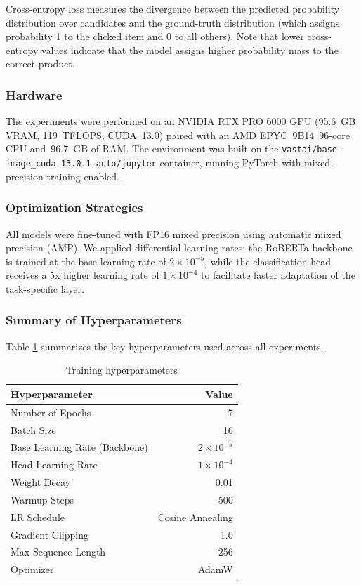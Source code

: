 \documentclass[10pt]{article}
\begin{document}
Cross-entropy loss measures the divergence between the predicted probability distribution over candidates and the ground-truth distribution (which assigns probability 1 to the clicked item and 0 to all others). Note that lower cross-entropy values indicate that the model assigns higher probability mass to the correct product.
\subsubsection*{Hardware}
The experiments were performed on an NVIDIA RTX PRO 6000 GPU (95.6~GB VRAM, 119~TFLOPS, CUDA~13.0) paired with an AMD EPYC~9B14~96-core CPU and~96.7~GB of RAM. The environment was built on the \texttt{vastai/base-image\_cuda-13.0.1-auto/jupyter} container, running PyTorch with mixed-precision training enabled.

\subsubsection*{Optimization Strategies}
All models were fine-tuned with FP16 mixed precision using automatic mixed precision (AMP). We applied differential learning rates: the RoBERTa backbone is trained at the base learning rate of $2 \times 10^{-5}$, while the classification head receives a 5x higher learning rate of $1 \times 10^{-4}$ to facilitate faster adaptation of the task-specific layer.

\subsubsection*{Summary of Hyperparameters}
Table \ref{tab:hyperparameters} summarizes the key hyperparameters used across all experiments.

\begin{table}[H]
\centering
\caption{Training hyperparameters}
\label{tab:hyperparameters}
\begin{tabular}{lr}
\hline
\textbf{Hyperparameter} & \textbf{Value} \\
\hline
Number of Epochs & 7 \\
Batch Size & 16 \\
Base Learning Rate (Backbone) & $2 \times 10^{-5}$ \\
Head Learning Rate & $1 \times 10^{-4}$ \\
Weight Decay & 0.01 \\
Warmup Steps & 500 \\
LR Schedule & Cosine Annealing \\
Gradient Clipping & 1.0 \\
Max Sequence Length & 256 \\
Optimizer & AdamW \\
\hline
\end{tabular}
\end{table}
\end{document}
